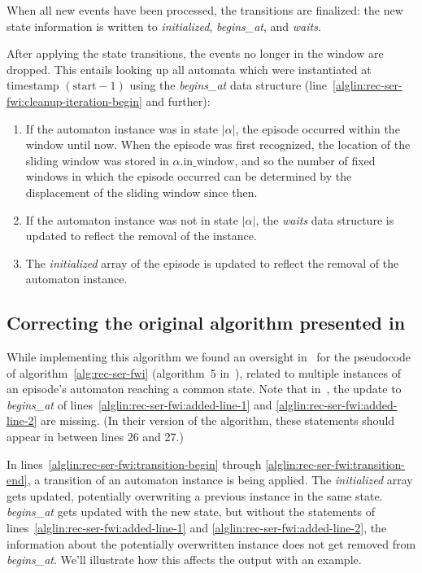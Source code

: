 When all new events have been processed, the transitions are finalized: the new state information is written to \emph{initialized}, \emph{begins\_at}, and \emph{waits}.

After applying the state transitions, the events no longer in the window are dropped. This entails looking up all automata which were instantiated at timestamp $ (\text{start} - 1) $ using the \emph{begins\_at} data structure (line~\ref{alglin:rec-ser-fwi:cleanup-iteration-begin} and further):

\begin{enumerate}
\item If the automaton instance was in state $ | \alpha | $, the episode occurred within the window until now. When the episode was first recognized, the location of the sliding window was stored in $ \alpha \text{.in\_window} $, and so the number of fixed windows in which the episode occurred can be determined by the displacement of the sliding window since then.
\item If the automaton instance was not in state $ | \alpha | $, the \emph{waits} data structure is updated to reflect the removal of the instance.
\item The \emph{initialized} array of the episode is updated to reflect the removal of the automaton instance.
\end{enumerate}

\subsection{Correcting the original algorithm presented in~\citep{mannila1997discovery}}

While implementing this algorithm we found an oversight in~\cite{mannila1997discovery} for the pseudocode of algorithm~\ref{alg:rec-ser-fwi} (algorithm~5 in~\cite{mannila1997discovery}), related to multiple instances of an episode's automaton reaching a common state. Note that in~\cite{mannila1997discovery}, the update to \emph{begins\_at} of lines~\ref{alglin:rec-ser-fwi:added-line-1} and \ref{alglin:rec-ser-fwi:added-line-2} are missing. (In their version of the algorithm, these statements should appear in between lines 26 and 27.)

In lines~\ref{alglin:rec-ser-fwi:transition-begin} through \ref{alglin:rec-ser-fwi:transition-end}, a transition of an automaton instance is being applied. The \emph{initialized} array gets updated, potentially overwriting a previous instance in the same state. \emph{begins\_at} gets updated with the new state, but without the statements of lines~\ref{alglin:rec-ser-fwi:added-line-1} and \ref{alglin:rec-ser-fwi:added-line-2}, the information about the potentially overwritten instance does not get removed from \emph{begins\_at}. We'll illustrate how this affects the output with an example.

